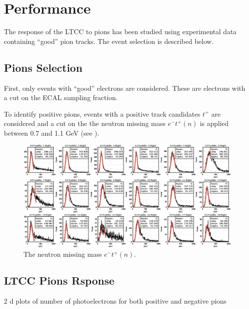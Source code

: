 \section{Performance}

The response of the LTCC to pions has been studied using experimental data containing ``good'' pion tracks.
The event selection is described below.

\subsection{Pions Selection}

First, only events with ``good'' electrons are considered. These are electrons with a cut on the ECAL sampling fraction.

To identify positive pions, events with a positive track candidates $t^+$ are considered and a cut on the the neutron missing mass $e^-t^+(n)$
is applied between 0.7 and 1.1 GeV (see ).



\begin{figure}
	\centering
	\includegraphics[width=0.98\columnwidth,keepaspectratio]{img/neutronMM.png}
	\caption{The neutron missing mass $e^-t^+(n)$.  }
	\label{fig:neutronMM}
\end{figure}






\subsection{LTCC Pions Rsponse}

2 d plots of number of photoelectrons for both positive and negative pions


